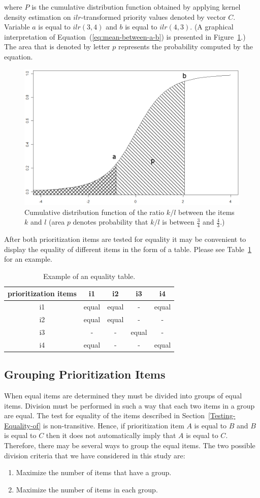 where $P$ is the cumulative distribution function obtained by applying kernel density estimation on $ilr$-transformed priority values denoted by vector $C$. Variable $a$ is equal to $ilr(3,4)$ and $b$ is equal to $ilr(4,3)$. (A graphical interpretation of Equation~(\ref{eq:mean-between-a-b}) is presented in Figure~\ref{fig:Probability-p-that}.)
The area that is denoted by letter $p$ represents the probability computed by the equation.

\begin{figure}
	\center
\includegraphics[scale=0.2]{fig/p}
\caption{
	\label{fig:Probability-p-that}
	Cumulative distribution function of the ratio $k/l$ between the items $k$ and $l$ (area $p$ denotes probability that $k/l$ is between $\frac{3}{4}$ and $\frac{4}{3}$.)
}
\end{figure}

After both prioritization items are tested for equality it may
be convenient to display the equality of different items in the form of a table.
Please see Table~\ref{tab:ECVexample} for an example.

\begin{table}
	\scriptsize
	\centering
\caption{Example of an equality table.}

\label{tab:ECVexample}
\begin{tabular}{|c|c|c|c|c|}
\hline 
prioritization items & i1 & i2 & i3 & i4\tabularnewline
\hline\hline 
i1 & equal & equal & - & equal\tabularnewline
\hline 
i2 & equal & equal & - & -\tabularnewline
\hline 
i3 & - & - & equal & -\tabularnewline
\hline 
i4 & equal & - & - & equal\tabularnewline
\hline
\end{tabular}
\end{table}

\subsection{Grouping Prioritization Items}
When equal items are determined they must be divided into groups of equal items. Division must be performed in such a way that each two items in a group are equal. The test for equality of the items described in Section~\ref{Testing-Equality-of} is non-transitive. Hence, if prioritization item $A$ is equal to $B$ and $B$ is equal to $C$ then it does not automatically imply that $A$ is equal to $C$. Therefore, there may be several ways to group the equal items. The two possible division criteria that we have considered in this study are:

\begin{enumerate}
\item Maximize the number of items that have a group.
\item Maximize the number of items in each group.
\end{enumerate}
